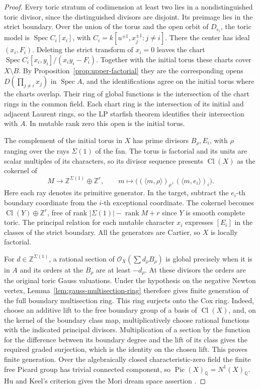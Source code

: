 \documentclass[11pt,reqno]{amsart}
\numberwithin{equation}{section}
\theoremstyle{definition}
\theoremstyle{remark}
\DeclareMathOperator{\Spec}{Spec}
\DeclareMathOperator{\Pic}{Pic}
\DeclareMathOperator{\Cl}{Cl}
\begin{document}
\begin{proof}
Every toric stratum of codimension at least two lies in a
nondistinguished toric divisor, since the distinguished divisors
are disjoint. Its preimage lies in the strict boundary. Over the
union of the torus and the open orbit of \(D_{e_i}\), the toric
model is \(\Spec C_i[x_i]\), with
\(C_i=k[u^{\pm1},x_j^{\pm1}:j\ne i]\). There the center has ideal
\((x_i,F_i)\). Deleting the strict transform of \(x_i=0\) leaves
the chart \(\Spec C_i[x_i,y_i]/(x_i y_i-F_i)\). Together with the
initial torus these charts cover \(X\setminus B\). By
Proposition~\ref{prop:upper-factorial} they are the corresponding
opens \(D(\prod_{j\ne i}x_j)\) in \(\Spec A\), and the
identifications agree on the initial torus where the charts
overlap. Their ring of global functions is the intersection of
the chart rings in the common field. Each chart ring is the
intersection of its initial and adjacent Laurent rings, so the
LP starfish theorem identifies their intersection with \(A\). In mutable rank zero this open is
the initial torus.

The complement of the initial torus in \(X\) has prime divisors
\(B_\rho,E_i\), with \(\rho\) ranging over the rays \(\Sigma(1)\)
of the fan. The torus is factorial and its units are scalar
multiples of its characters, so its divisor sequence presents
\(\Cl(X)\) as the cokernel of
\[ M\longrightarrow\mathbb Z^{\Sigma(1)}\oplus\mathbb Z^r, \qquad m\longmapsto \bigl((\langle m,\rho\rangle)_\rho, (\langle m,e_i\rangle)_i\bigr). \]
Here each ray denotes its primitive generator. In the target,
subtract the \(e_i\)-th boundary coordinate from the \(i\)-th
exceptional coordinate. The cokernel becomes
\(\Cl(Y)\oplus\mathbb Z^r\), free of rank
\(|\Sigma(1)|-\operatorname{rank}M+r\) since \(Y\) is smooth
complete toric. The principal relation for each mutable character
\(x_i\) expresses \([E_i]\) in the classes of the strict boundary.
All the generators are Cartier, so \(X\) is locally factorial.

For \(d\in\mathbb Z^{\Sigma(1)}\), a rational section of
\(\mathcal O_X(\sum d_\rho B_\rho)\) is global precisely when it
is in \(A\) and its orders at the \(B_\rho\) are at least
\(-d_\rho\). At these divisors the orders are the original toric
Gauss valuations. Under the hypothesis on the negative Newton vertex,
Lemma~\ref{lem:gauss-multisection-ring} therefore gives finite
generation of the full boundary multisection ring. This ring surjects
onto the Cox ring. Indeed, choose an additive lift to the free boundary
group of a basis of \(\Cl(X)\), and, on the kernel of the boundary
class map, multiplicatively choose rational functions with the
indicated principal divisors. Multiplication of a section by the
function for the difference between its boundary degree and the
lift of its class gives the required graded surjection, which is
the identity on the chosen lift. This proves finite generation.
Over the algebraically closed characteristic-zero field the finite
free Picard group has trivial connected component, so
\(\Pic(X)_{\mathbb Q}=N^1(X)_{\mathbb Q}\). Hu and Keel's criterion gives the Mori dream space assertion \cite[Proposition~2.9]{HuKeel}.
\end{proof}
\end{document}
